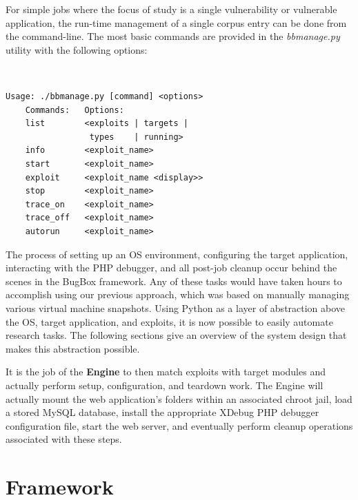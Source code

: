 \documentclass[letterpaper,twocolumn,10pt]{article}
\begin{document}
For simple jobs where the focus of study is a single vulnerability or vulnerable application, the run-time management of a single corpus entry can be done from the command-line. The most basic commands are provided in the \emph{bbmanage.py} utility with the following options:

{\tt \footnotesize
\begin{verbatim}
Usage: ./bbmanage.py [command] <options>
    Commands:   Options:
    list        <exploits | targets | 
                 types    | running>
    info        <exploit_name>
    start       <exploit_name>
    exploit     <exploit_name <display>>
    stop        <exploit_name>
    trace_on    <exploit_name>
    trace_off   <exploit_name>
    autorun     <exploit_name>
\end{verbatim}
}

The process of setting up an OS environment, configuring the target application, interacting with the PHP debugger, and all post-job cleanup occur behind the scenes in the BugBox framework. Any of these tasks would have taken hours to accomplish using our previous approach, which was based on manually managing various virtual machine snapshots. Using Python as a layer of abstraction above the OS, target application, and exploits, it is now possible to easily automate research tasks. The following sections give an overview of the system design that makes this abstraction possible.

It is the job of the {\bf Engine} to then match exploits with target modules and actually perform setup, configuration, and teardown work. The Engine will actually mount the web application's folders within an associated chroot jail, load a stored MySQL database, install the appropriate XDebug PHP debugger configuration file, start the web server, and eventually perform cleanup operations associated with these steps.

\section{Framework}
\end{document}
